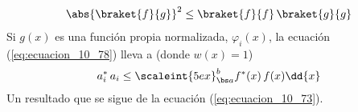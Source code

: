 \begin{align}
\abs{\braket{f}{g}}^{2} \leq \braket{f}{f} \, \braket{g}{g}
\label{eq:ecuacion_10_78a}
\end{align}
Si $g(x)$ es una función propia normalizada, $\varphi_{i}(x)$, la ecuación (\ref{eq:ecuacion_10_78}) lleva a (donde $w(x)=1$)
\begin{align}
a_{i}^{*} \, a_{i} \leq \scaleint{5ex}_{\bs a}^{b} f^{*}(x) \, f(x) \dd{x} 
\label{eq:ecuacion_10_81}
\end{align}
Un resultado que se sigue de la ecuación (\ref{eq:ecuacion_10_73}).

